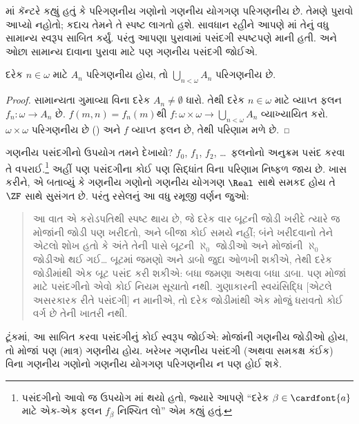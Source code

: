 \begin{ex}
\citeyear{Cantor1878}માં કૅન્ટરે કહ્યું
હતું કે પરિગણનીય ગણોનો ગણનીય યોગગણ
પરિગણનીય છે. તેમણે પુરાવો આપ્યો નહોતો;
કદાચ તેમને તે સ્પષ્ટ લાગતો હશે.
સાવધાન રહીને આપણે
માં
તેનું વધુ સામાન્ય સ્વરૂપ સાબિત કર્યું.
પરંતુ આપણા પુરાવામાં પસંદગી સ્પષ્ટપણે
માની હતી. અને ઓછા સામાન્ય દાવાના
પુરાવા માટે પણ ગણનીય પસંદગી જોઈએ.

\begin{thm}
દરેક $n \in \omega$ માટે $A_n$ પરિગણનીય
હોય, તો $\bigcup_{n <
\omega} A_n$ પરિગણનીય છે.
\end{thm}

\begin{proof}
સામાન્યતા ગુમાવ્યા વિના દરેક
$A_n \neq \emptyset$ ધારો. તેથી દરેક
$n \in \omega$ માટે વ્યાપ્ત ફલન
$f_n \colon \omega \to A_n$ છે.
$f(m, n) = f_n(m)$થી
$f \colon \omega \times \omega \to
\bigcup_{n < \omega} A_n$
વ્યાખ્યાયિત કરો. $\omega \times \omega$
પરિગણનીય છે
()
અને $f$ વ્યાપ્ત ફલન છે,
તેથી પરિણામ મળે છે.
\end{proof}
\noindent
ગણનીય પસંદગીનો ઉપયોગ તમને દેખાયો?
$f_0$, $f_1$, $f_2$, \dots\ ફલનોનો અનુક્રમ
પસંદ કરવા તે વપરાઈ.\footnote{પસંદગીનો
આવો જ ઉપયોગ
માં
થયો હતો, જ્યારે આપણે ``દરેક
$\beta \in \cardfont{a}$ માટે
એક-એક ફલન $f_\beta$ નિશ્ચિત લો''
એમ કહ્યું હતું.} અહીં પણ પસંદગીના
કોઈ પણ સિદ્ધાંત વિના પરિણામ નિષ્ફળ
જાય છે. ખાસ કરીને,
\citet{FefermanLevy1963}એ બતાવ્યું કે
ગણનીય ગણોનો ગણનીય યોગગણ
$\Real$ સાથે સમકદ હોય તે $\ZF$ સાથે
સુસંગત છે. 
પરંતુ રસેલનું આ વધુ રમૂજી
વર્ણન જુઓ:
\begin{quote}
  આ વાત એ કરોડપતિથી સ્પષ્ટ થાય છે, જે
  દરેક વાર બૂટની જોડી ખરીદે ત્યારે જ
  મોજાંની જોડી પણ ખરીદતો, અને બીજા
  કોઈ સમયે નહીં; બંને ખરીદવાનો તેને
  એટલો શોખ હતો કે અંતે તેની પાસે
  બૂટની $\aleph_0$ જોડીઓ અને મોજાંની
  $\aleph_0$ જોડીઓ થઈ ગઈ\dots\@
  બૂટમાં જમણો અને ડાબો જુદા ઓળખી શકીએ,
  તેથી દરેક જોડીમાંથી એક બૂટ પસંદ કરી
  શકીએ: બધા જમણા અથવા બધા ડાબા.
  પણ મોજાં માટે પસંદગીનો એવો કોઈ
  નિયમ સૂચાતો નથી. ગુણાકારની સ્વયંસિદ્ધિ
  [એટલે અસરકારક રીતે પસંદગી] ન માનીએ,
  તો દરેક જોડીમાંથી એક મોજું ધરાવતો
  કોઈ વર્ગ છે તેની ખાતરી નથી.
  \citep[p.~126]{Russell1919}
\end{quote}
ટૂંકમાં, આ સાબિત કરવા પસંદગીનું કોઈ
સ્વરૂપ જોઈએ: મોજાંની ગણનીય જોડીઓ હોય,
તો મોજાં પણ (માત્ર) ગણનીય હોય.
ખરેખર ગણનીય પસંદગી (અથવા સમકક્ષ
કંઈક) વિના ગણનીય ગણોનો ગણનીય
યોગગણ પરિગણનીય ન પણ હોઈ શકે.
\end{ex}

